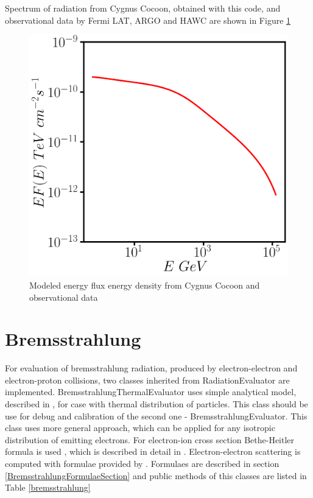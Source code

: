 Spectrum of radiation from Cygnus Cocoon, obtained with this code, and observational data by Fermi LAT, ARGO and HAWC \cite{Ackermann2011, Bartoli2014, Abeysekara2021} are shown in Figure \ref{pion}
\begin{figure}
	\centering
	\includegraphics[width=12.5 cm]{./fig/pion.png} 
	\caption{Modeled energy flux energy density from Cygnus Cocoon and observational data}
	\label{pion}
\end{figure}

\section{Bremsstrahlung}

For evaluation of bremsstrahlung radiation, produced by electron-electron and electron-proton collisions, two classes inherited from RadiationEvaluator are implemented. BremsstrahlungThermalEvaluator uses simple analytical model, described in \cite{Rybicki}, for case with thermal distribution of particles. This class should be use for debug and calibration of the second one - BremsstrahlungEvaluator. This class uses more general approach, which can be applied for any isotropic distribution of emitting electrons. For electron-ion cross section Bethe-Heitler formula is used \cite{BetheHeitler}, which is described in detail in \cite{JauchRohrlich}. Electron-electron scattering is computed with formulae provided by \cite{Baring1999}. Formulaes are described in section \ref{BremsstrahlungFormulaeSection} and public methods of this classes are listed in Table \ref{bremsstrahlung}

